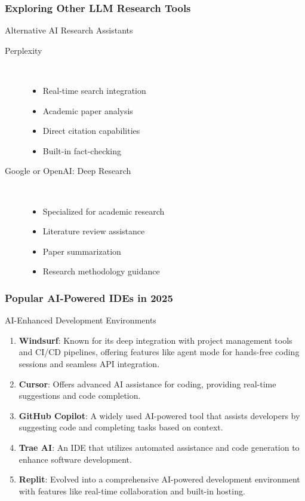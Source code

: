 \documentclass{beamer}
\begin{document}
\begin{frame}
\frametitle{Exploring Other LLM Research Tools}

\begin{block}{Alternative AI Research Assistants}
\begin{description}
\item[Perplexity] \hfill \\
   \begin{itemize}
   \item Real-time search integration
   \item Academic paper analysis
   \item Direct citation capabilities 
   \item Built-in fact-checking
   \end{itemize}
   
\item[Google or OpenAI: Deep Research] \hfill \\
   \begin{itemize}
   \item Specialized for academic research
   \item Literature review assistance
   \item Paper summarization
   \item Research methodology guidance
   \end{itemize}
\end{description}
\end{block}


\end{frame}

\begin{frame}
\frametitle{Popular AI-Powered IDEs in 2025}

\begin{block}{AI-Enhanced Development Environments}
\begin{enumerate}
\item \textbf{Windsurf}: Known for its deep integration with project management tools and CI/CD pipelines, offering features like agent mode for hands-free coding sessions and seamless API integration.

\item \textbf{Cursor}: Offers advanced AI assistance for coding, providing real-time suggestions and code completion.

\item \textbf{GitHub Copilot}: A widely used AI-powered tool that assists developers by suggesting code and completing tasks based on context.

\item \textbf{Trae AI}: An IDE that utilizes automated assistance and code generation to enhance software development.

\item \textbf{Replit}: Evolved into a comprehensive AI-powered development environment with features like real-time collaboration and built-in hosting.
\end{enumerate}
\end{block}
\end{frame}
\end{document}
